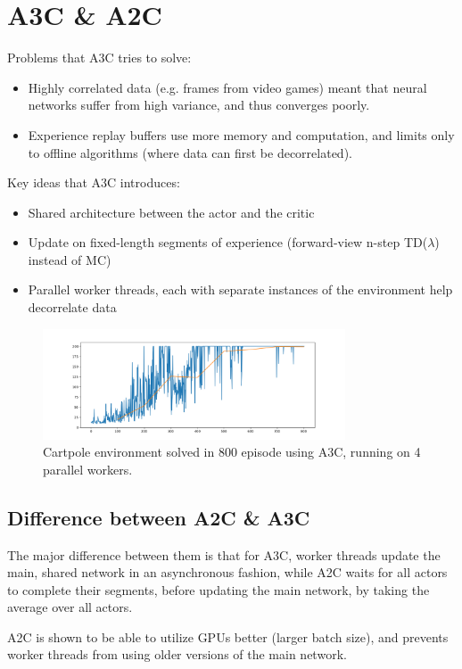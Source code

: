 \documentclass[11pt]{article} %
\begin{document}
\section{A3C \& A2C}
Problems that A3C tries to solve:
\begin{itemize}
    \item Highly correlated data (e.g. frames from video games) meant that neural networks suffer from high variance, and thus converges poorly.
    \item Experience replay buffers use more memory and computation, and limits only to offline algorithms (where data can first be decorrelated).
\end{itemize}
Key ideas that A3C introduces:
\begin{itemize}
    \item Shared architecture between the actor and the critic
    \item Update on fixed-length segments of experience (forward-view n-step TD($\lambda$) instead of MC)
    \item Parallel worker threads, each with separate instances of the environment help decorrelate data
\end{itemize}

\begin{figure}
    \centering
    \includegraphics[width=0.8\textwidth]{A3C/cartpole-MC/cartpole_800eps.png}
    \caption{Cartpole environment solved in 800 episode using A3C, running on 4 parallel workers.}
    \label{fig:my_label}
\end{figure}

\subsection{Difference between A2C \& A3C}
The major difference between them is that for A3C, worker threads update the main, shared network in an asynchronous fashion, while A2C waits for all actors to complete their segments, before updating the main network, by taking the average over all actors.

A2C is shown to be able to utilize GPUs better (larger batch size), and prevents worker threads from using older versions of the main network.
\end{document}

